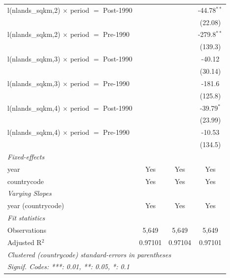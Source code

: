 \begin{tabular}{lccc}
   l(nlands\_sqkm,2) $\times$ period $=$ Post-1990            &                &                         & -44.78$^{**}$\\   
                                                              &                &                         & (22.08)\\   
   l(nlands\_sqkm,2) $\times$ period $=$ Pre-1990             &                &                         & -279.8$^{**}$\\   
                                                              &                &                         & (139.3)\\   
   l(nlands\_sqkm,3) $\times$ period $=$ Post-1990            &                &                         & -40.12\\   
                                                              &                &                         & (30.14)\\   
   l(nlands\_sqkm,3) $\times$ period $=$ Pre-1990             &                &                         & -181.6\\   
                                                              &                &                         & (125.8)\\   
   l(nlands\_sqkm,4) $\times$ period $=$ Post-1990            &                &                         & -39.79$^{*}$\\   
                                                              &                &                         & (23.99)\\   
   l(nlands\_sqkm,4) $\times$ period $=$ Pre-1990             &                &                         & -10.53\\   
                                                              &                &                         & (134.5)\\   
   \midrule
   \emph{Fixed-effects}\\
   year                                                       & Yes            & Yes                     & Yes\\  
   countrycode                                                & Yes            & Yes                     & Yes\\  
   \midrule
   \emph{Varying Slopes}\\
   year (countrycode)                                         & Yes            & Yes                     & Yes\\  
   \midrule
   \emph{Fit statistics}\\
   Observations                                               & 5,649          & 5,649                   & 5,649\\  
   Adjusted R$^2$                                             & 0.97101        & 0.97104                 & 0.97101\\  
   \midrule \midrule
   \multicolumn{4}{l}{\emph{Clustered (countrycode) standard-errors in parentheses}}\\
   \multicolumn{4}{l}{\emph{Signif. Codes: ***: 0.01, **: 0.05, *: 0.1}}\\
\end{tabular}
\par\endgroup


